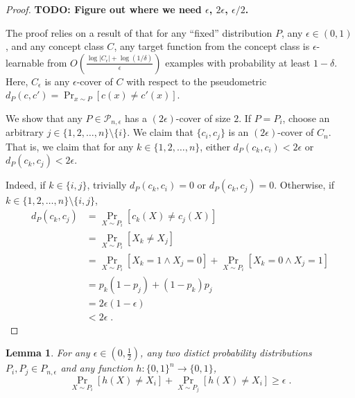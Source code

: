 \documentclass[12pt]{article}
\newtheorem{lemma}[proposition]{Lemma}
\renewcommand{\P}{\mathcal{P}}
\begin{document}
\begin{proof}
\textbf{TODO: Figure out where we need $\epsilon$, $2\epsilon$, $\epsilon/2$.}

The proof relies on a result of \cite{Benedek-Itai-1991} that for any ``fixed''
distribution $P$, any $\epsilon \in (0,1)$, and any concept class $C$, any
target function from the concept class is $\epsilon$-learnable from $O \left(
\frac{\log |C_\epsilon| + \log (1/\delta)}{\epsilon}\right)$ examples with
probability at least $1-\delta$. Here, $C_\epsilon$ is any $\epsilon$-cover of
$C$ with respect to the pseudometric $d_P(c,c') = \Pr_{x \sim P}[c(x) \neq
c'(x)]$.

We show that any $P \in \P_{n,\epsilon}$ has a $(2\epsilon)$-cover of size $2$.
If $P = P_i$, choose an arbitrary $j \in \{1,2,\dots,n\} \setminus \{i\}$. We
claim that $\{c_i, c_j\}$ is an $(2\epsilon)$-cover of $C_n$. That is, we claim
that for any $k \in \{1,2,\dots,n\}$, either $d_P(c_k,c_i) < 2\epsilon$ or
$d_P(c_k,c_j) < 2\epsilon$.

Indeed, if $k \in \{i,j\}$, trivially $d_P(c_k,c_i) = 0$ or $d_P(c_k,c_j) = 0$.
Otherwise, if  $k \in \{1,2,\dots,n\} \setminus \{i,j\}$,
\begin{align*}
d_P(c_k, c_j)
& = \Pr_{X \sim P_i}[c_k(X) \neq c_j(X)] \\
& = \Pr_{X \sim P_i}[X_k \neq X_j] \\
& = \Pr_{X \sim P_i}[X_k = 1 \wedge X_j = 0] + \Pr_{X \sim P_i}[X_k = 0 \wedge X_j = 1] \\
& = p_k(1 - p_j) + (1 - p_k) p_j \\
& = 2 \epsilon (1-\epsilon) \\
& < 2 \epsilon \; .
\end{align*}
\end{proof}

\begin{lemma}
\label{lemma:projection-distances}
For any $\epsilon \in (0,\frac{1}{2})$,
any two distict probability distributions $P_i,P_j \in P_{n,\epsilon}$
and any function $h:\{0,1\}^n \to \{0,1\}$,
$$
\Pr_{X \sim P_i}[h(X) \neq X_i] + \Pr_{X \sim P_j}[h(X) \neq X_i] \ge \epsilon \; .
$$
\end{lemma}
\end{document}

